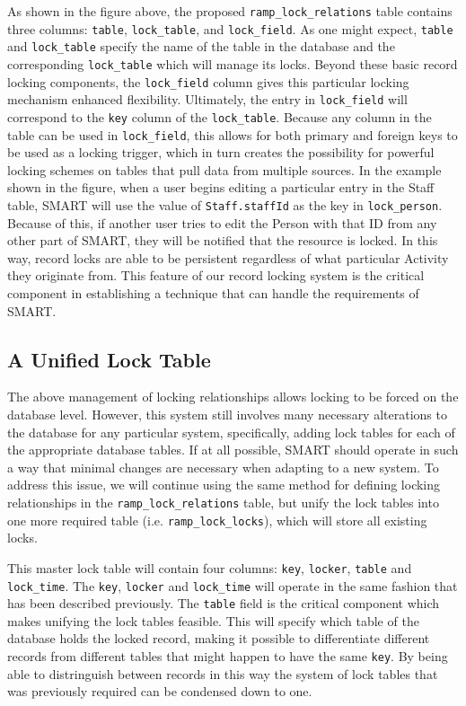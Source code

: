 \documentclass[12pt]{article}
\newcommand{\code}[1]{\texttt{#1}}
\begin{document}
As shown in the figure above, the proposed \code{ramp\_lock\_relations} table contains three columns: \code{table}, \code{lock\_table}, and \code{lock\_field}. As one might expect, \code{table} and \code{lock\_table} specify the name of the table in the database and the corresponding \code{lock\_table} which will manage its locks. Beyond these basic record locking components, the \code{lock\_field} column gives this particular locking mechanism enhanced flexibility. Ultimately, the entry in \code{lock\_field} will correspond to the \code{key} column of the \code{lock\_table}. Because any column in the table can be used in \code{lock\_field}, this allows for both primary and foreign keys to be used as a locking trigger, which in turn creates the possibility for powerful locking schemes on tables that pull data from multiple sources. In the example shown in the figure, when a user begins editing a particular entry in the Staff table, SMART will use the value of \code{Staff.staffId} as the key in \code{lock\_person}. Because of this, if another user tries to edit the Person with that ID from any other part of SMART, they will be notified that the resource is locked. In this way, record locks are able to be persistent regardless of what particular Activity they originate from. This feature of our record locking system is the critical component in establishing a technique that can handle the requirements of SMART.

\subsection{A Unified Lock Table}
The above management of locking relationships allows locking to be forced on the database level. However, this system still involves many necessary alterations to the database for any particular system, specifically, adding lock tables for each of the appropriate database tables. If at all possible, SMART should operate in such a way that minimal changes are necessary when adapting to a new system. To address this issue, we will continue using the same method for defining locking relationships in the \code{ramp\_lock\_relations} table, but unify the lock tables into one more required table (i.e. \code{ramp\_lock\_locks}), which will store all existing locks.

This master lock table will contain four columns: \code{key}, \code{locker}, \code{table} and \code{lock\_time}. The \code{key}, \code{locker} and \code{lock\_time} will operate in the same fashion that has been described previously. The \code{table} field is the critical component which makes unifying the lock tables feasible. This will specify which table of the database holds the locked record, making it possible to differentiate different records from different tables that might happen to have the same \code{key}. By being able to distringuish between records in this way the system of lock tables that was previously required can be condensed down to one.
\end{document}
